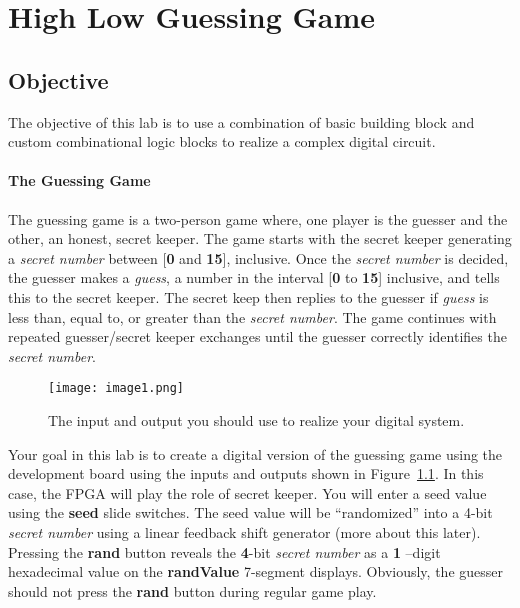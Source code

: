 \chapter{High Low Guessing Game}
\label{RPS}
\graphicspath{ {./Lab04HighLow/Fig} }

\hypertarget{objective}{%
\section{\texorpdfstring{Objective }{Objective }}
\label{section:objectiveHighLowguess}}

The objective of this lab is to use a combination of basic building
block and custom combinational logic blocks to realize a complex digital
circuit.

\subsubsection{The Guessing Game}

The guessing game is a two-person game where, one player is the guesser
and the other, an honest, secret keeper. The game starts with the secret
keeper generating a \emph{secret number} between {[}\textbf{0} and
\textbf{15}{]}, inclusive. Once the \emph{secret number} is decided, the
guesser makes a \emph{guess}, a number in the interval {[}\textbf{0} to
\textbf{15}{]} inclusive, and tells this to the secret keeper. The
secret keep then replies to the guesser if \emph{guess} is less than,
equal to, or greater than the \emph{secret number}. The game continues
with repeated guesser/secret keeper exchanges until the guesser
correctly identifies the \emph{secret number}.

\begin{figure}[ht]
\texttt{[image: image1.png]}
\caption{The input and output you should use to realize your digital system.}
\label{fig:inputOutputDevBoard}
\end{figure}

Your goal in this lab is to create a digital version of the guessing
game using the development board using the inputs and outputs shown in
Figure~\ref{fig:inputOutputDevBoard}. In this case, the FPGA will play the role of secret keeper.
You will enter a seed value using the \textbf{seed} slide switches. The
seed value will be ``randomized'' into a 4-bit \emph{secret number}
using a linear feedback shift generator (more about this later).
Pressing the \textbf{rand} button reveals the \textbf{4}-bit
\emph{secret number} as a \textbf{1} --digit hexadecimal value on the
\textbf{randValue} 7-segment displays. Obviously, the guesser should not
press the \textbf{rand} button during regular game play.


